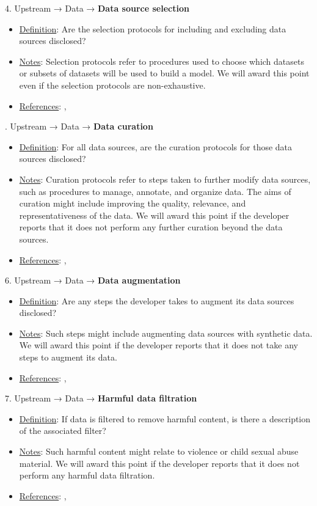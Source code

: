 4. Upstream → Data → \textbf{Data source selection}
\vspace{-\parskip}
\begin{itemize}
	\item
	\underline{Definition}: Are the selection protocols for including and excluding data sources disclosed?
	\item
	\underline{Notes}: Selection protocols refer to procedures used to choose which datasets or subsets of datasets will be used to build a model. We will award this point even if the selection protocols are non-exhaustive.
	\item
	\underline{References}: \citet{gebru2021datasheets}, \citet{hutchinson2021towards}
\end{itemize}


. Upstream → Data → \textbf{Data curation}
\vspace{-\parskip}
\begin{itemize}
	\item
	\underline{Definition}: For all data sources, are the curation protocols for those data sources disclosed?
	\item
	\underline{Notes}: Curation protocols refer to steps taken to further modify data sources, such as procedures to manage, annotate, and organize data. The aims of curation might include improving the quality, relevance, and representativeness of the data. We will award this point if the developer reports that it does not perform any further curation beyond the data sources.
	\item
	\underline{References}: \citet{gebru2021datasheets}, \citet{hutchinson2021towards}
\end{itemize}


6. Upstream → Data → \textbf{Data augmentation}
\vspace{-\parskip}
\begin{itemize}
	\item
	\underline{Definition}: Are any steps the developer takes to augment its data sources disclosed?
	\item
	\underline{Notes}: Such steps might include augmenting data sources with synthetic data. We will award this point if the developer reports that it does not take any steps to augment its data.
	\item
	\underline{References}: \citet{gebru2021datasheets}, \citet{hutchinson2021towards}
\end{itemize}


7. Upstream → Data → \textbf{Harmful data filtration}
\vspace{-\parskip}
\begin{itemize}
	\item
	\underline{Definition}: If data is filtered to remove harmful content, is there a description of the associated filter?
	\item
	\underline{Notes}: Such harmful content might relate to violence or child sexual abuse material. We will award this point if the developer reports that it does not perform any harmful data filtration.
	\item
	\underline{References}: \citet{dodge2021c4}, \citet{longpre2023pretrainer}
\end{itemize}


